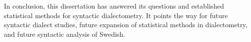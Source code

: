 In conclusion, this dissertation has answered its questions and
established statistical methods for syntactic dialectometry. It points
the way for future syntactic dialect studies, future expansion of statistical
methods in dialectometry, and future syntactic analysis of Swedish.

